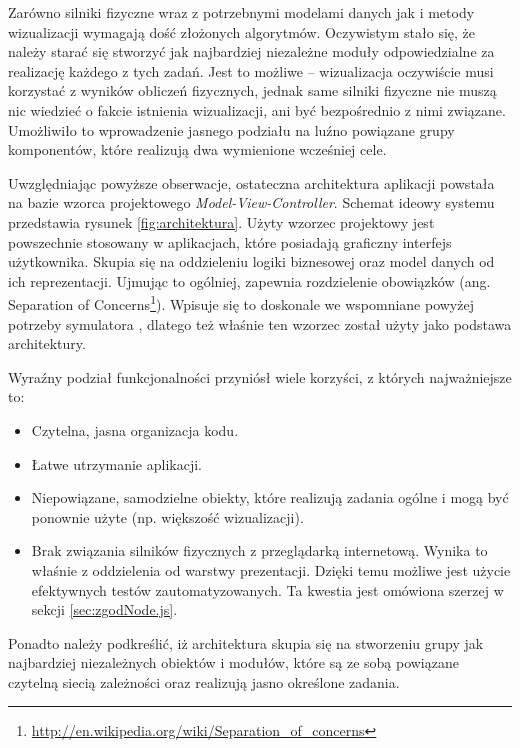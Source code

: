 Zarówno silniki fizyczne wraz z potrzebnymi modelami danych jak i metody
wizualizacji wymagają dość złożonych algorytmów. Oczywistym stało się, że
należy starać się stworzyć jak najbardziej niezależne moduły odpowiedzialne za
realizację każdego z tych zadań. Jest to możliwe -- wizualizacja oczywiście
musi korzystać z wyników obliczeń fizycznych, jednak same silniki fizyczne nie
muszą nic wiedzieć o fakcie istnienia wizualizacji, ani być bezpośrednio z
nimi związane. Umożliwiło to wprowadzenie jasnego podziału na luźno powiązane
grupy komponentów, które realizują dwa wymienione wcześniej cele.

Uwzględniając powyższe obserwacje, ostateczna architektura aplikacji powstała na
bazie wzorca projektowego \emph{Model-View-Controller}. Schemat ideowy systemu
\en przedstawia rysunek \ref{fig:architektura}. Użyty wzorzec projektowy jest
powszechnie stosowany w aplikacjach, które posiadają graficzny interfejs
użytkownika. Skupia się na oddzieleniu logiki biznesowej oraz model danych od
ich reprezentacji. Ujmując to ogólniej, zapewnia rozdzielenie obowiązków (ang.
Separation of
Concerns\footnote{\url{http://en.wikipedia.org/wiki/Separation_of_concerns}}).
Wpisuje się to doskonale we wspomniane powyżej potrzeby symulatora \en, dlatego
też właśnie ten wzorzec został użyty jako podstawa architektury.

Wyraźny podział funkcjonalności przyniósł wiele korzyści, z których
najważniejsze to:

\begin{itemize}
\item Czytelna, jasna organizacja kodu.

\item Łatwe utrzymanie aplikacji.

\item Niepowiązane, samodzielne obiekty, które realizują zadania ogólne i mogą
być ponownie użyte (np. większość wizualizacji).

\item Brak związania silników fizycznych z przeglądarką internetową. Wynika to
właśnie z oddzielenia od warstwy prezentacji. Dzięki temu możliwe jest użycie
efektywnych testów zautomatyzowanych. Ta kwestia jest omówiona szerzej w sekcji
\ref{sec:zgodNode.js}.

\end{itemize}

Ponadto należy podkreślić, iż architektura \en skupia się na stworzeniu grupy
jak najbardziej niezależnych obiektów i modułów, które są ze sobą powiązane
czytelną siecią zależności oraz realizują jasno określone zadania.

